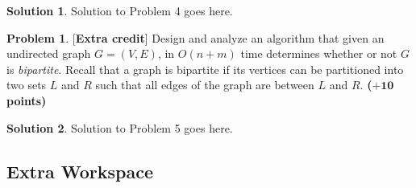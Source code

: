 \documentclass{article}
\theoremstyle{definition}
\newtheorem{problem}{Problem}
\newtheorem*{solution*}{Solution}
\newenvironment{solution}{\begin{solution*}}{{} \end{solution*}}
\newcommand{\grade}[1]{\hfill{\textbf{($\mathbf{#1}$ points)}}}
\begin{document}
\begin{solution}
Solution to Problem 4 goes here. 
\end{solution}
\clearpage

\begin{problem}\label{extra}[\textbf{Extra credit}]
	Design and analyze an algorithm that given an undirected graph $G=(V,E)$, in $O(n+m)$ time determines whether or not $G$ is \emph{bipartite}. Recall that a graph is bipartite if its vertices can be partitioned into two sets $L$ and $R$ such that all 
	edges of the graph are between $L$ and $R$. 
	\grade{+10}
\end{problem}



\begin{solution}
Solution to Problem 5 goes here. 
\end{solution}

\newpage
\subsection*{Extra Workspace}
\end{document}
